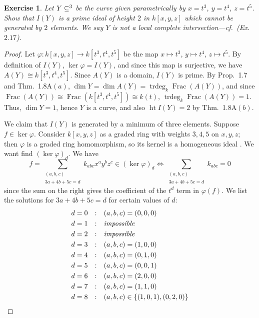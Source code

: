 \documentclass[12pt,letterpaper]{article}
\newtheorem{problem}{Exercise}[section]
\theoremstyle{definition}
\theoremstyle{remark}
\numberwithin{equation}{section}
\numberwithin{figure}{problem}
\DeclareMathOperator{\Ht}{ht}
\let\AA\relax
\DeclareMathOperator{\AA}{\mathbb{A}}
\DeclareMathOperator{\Frac}{Frac}
\DeclareMathOperator{\trdeg}{trdeg}
\begin{document}
\begin{problem}
  Let $Y \subseteq \AA^3$ be the curve given parametrically by
  $x = t^3$, $y= t^4$, $z = t^5$.
  Show that $I(Y)$ is a prime ideal of height $2$ in $k[x,y,z]$ which cannot
  be generated by $2$ elements.
  We say $Y$ is \emph{not a local complete
  intersection}---cf.~\emph{(Ex.~$2.17$)}. 
\end{problem}
\begin{proof}
  Let $\varphi\colon k[x,y,z] \to k[t^3,t^4,t^5]$ be the map $x \mapsto t^3$, $y
  \mapsto t^4$, $z \mapsto t^5$.
  By definition of $I(Y)$, $\ker\varphi = I(Y)$, and since this map is
  surjective, we have $A(Y) \cong k[t^3,t^4,t^5]$.
  Since $A(Y)$ is a domain, $I(Y)$ is prime.
  By Prop.~1.7 and Thm.~1.8A$(a)$, $\dim Y = \dim A(Y) = \trdeg_k \Frac(A(Y))$,
  and since $\Frac(A(Y)) \cong \Frac(k[t^3,t^4,t^5]) \cong k(t)$,
  $\trdeg_k \Frac(A(Y)) = 1$.
  Thus, $\dim Y = 1$, hence $Y$ is a curve, and also $\Ht I(Y) = 2$ by
  Thm.~1.8A$(b)$.
  \par We claim that $I(Y)$ is generated by a minimum of three elements.
  Suppose $f \in \ker\varphi$.
  Consider $k[x,y,z]$ as a graded ring with weights $3,4,5$ on $x,y,z$; then
  $\varphi$ is a graded ring homomorphism, so its kernel is a homogeneous ideal
  \cite[Ch.~II, \S11.3, Prop.~3]{Bou74}.
  We want find $(\ker\varphi)_{d}$.
  We have
  \begin{equation*}
    f = \sum_{\substack{(a,b,c)\\3a+4b+5c=d}} k_{abc}x^ay^bz^c \in
    (\ker\varphi)_d \iff \sum_{\substack{(a,b,c)\\3a+4b+5c=d}} k_{abc} = 0
  \end{equation*}
  since the sum on the right gives the coefficient of the $t^d$ term in
  $\varphi(f)$.
  We list the solutions for $3a+4b+5c=d$ for certain values of $d$:
  \begin{alignat*}{10}
    d &= 0&:& \quad (a,b,c) = (0,0,0)\\
    d &= 1&:& \quad \text{\it impossible}\\
    d &= 2&:& \quad \text{\it impossible}\\
    d &= 3&:& \quad (a,b,c) = (1,0,0)\\
    d &= 4&:& \quad (a,b,c) = (0,1,0)\\
    d &= 5&:& \quad (a,b,c) = (0,0,1)\\
    d &= 6&:& \quad (a,b,c) = (2,0,0)\\
    d &= 7&:& \quad (a,b,c) = (1,1,0)\\
    d &= 8&:& \quad (a,b,c) \in \{(1,0,1),(0,2,0)\}\\

\end{alignat*}
\end{proof}
\end{document}
